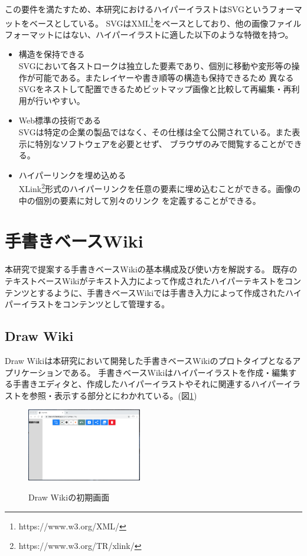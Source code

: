 この要件を満たすため、本研究におけるハイパーイラストはSVG\cite{aboutsvg}というフォーマットをベースとしている。
SVGはXML\footnote{https://www.w3.org/XML/}をベースとしており、他の画像ファイルフォーマットにはない、ハイパーイラストに適した以下のような特徴を持つ。
\begin{itemize}
    \item 構造を保持できる\\
    SVGにおいて各ストロークは独立した要素であり、個別に移動や変形等の操作が可能である。またレイヤーや書き順等の構造も保持できるため
    異なるSVGをネストして配置できるためビットマップ画像と比較して再編集・再利用が行いやすい。
    \item Web標準の技術である\\
    SVGは特定の企業の製品ではなく、その仕様は全て公開されている。また表示に特別なソフトウェアを必要とせず、
    ブラウザのみで閲覧することができる。
    \item ハイパーリンクを埋め込める\\
    XLink\footnote{https://www.w3.org/TR/xlink/}形式のハイパーリンクを任意の要素に埋め込むことができる。画像の中の個別の要素に対して別々のリンク
    を定義することができる。
\end{itemize}

\section{手書きベースWiki}
本研究で提案する手書きベースWikiの基本構成及び使い方を解説する。
既存のテキストベースWikiがテキスト入力によって作成されたハイパーテキストをコンテンツとするように、手書きベースWikiでは手書き入力によって作成されたハイパーイラストをコンテンツとして管理する。

\subsection{Draw Wiki}
Draw Wikiは本研究において開発した手書きベースWikiのプロトタイプとなるアプリケーションである。
手書きベースWikiはハイパーイラストを作成・編集する手書きエディタと、作成したハイパーイラストやそれに関連するハイパーイラストを参照・表示する部分とにわかれている。(図\ref{drawwiki})
\begin{figure}[htbp]
    \begin{center}
    {\includegraphics[width=50mm]{images/initialdrawwiki.png}} \end{center}
    \caption{Draw Wikiの初期画面}
    \label{drawwiki}
\end{figure}


